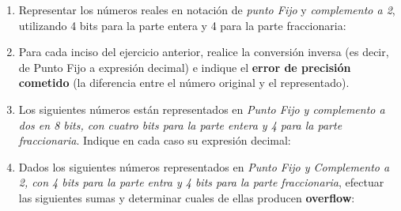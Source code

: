 \documentclass[12pt]{article}
\begin{document}
\begin{enumerate}[resume]

    \item Representar los números reales en notación de \emph{punto Fijo} y
        \emph{complemento a 2}, utilizando 4 bits para la parte entera y 4
        para la parte fraccionaria:


    \item Para cada inciso del ejercicio anterior, realice la conversión
        inversa (es decir, de Punto Fijo a expresión decimal) e indique el
        \textbf{error de precisión cometido} (la diferencia entre el número
        original y el representado).

    \item Los siguientes números están representados en \emph{Punto Fijo
        y complemento a dos en 8 bits, con cuatro bits para la parte entera y
        4 para la parte fraccionaria}. Indique en cada caso su expresión decimal:


    \item Dados los siguientes números representados en \emph{Punto Fijo y
        Complemento a 2, con 4 bits para la parte entra y 4 bits para la parte
        fraccionaria}, efectuar las siguientes sumas y determinar cuales de ellas
        producen \textbf{overflow}:


\end{enumerate}
\end{document}
